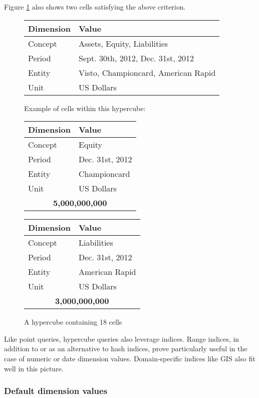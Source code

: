 \documentclass{acm_proc_article-sp}
\begin{document}
Figure \ref{fig-hypercube} also shows two cells satisfying the above criterion.

\begin{figure}
\caption{A hypercube containing 18 cells}
\label{fig-hypercube}
\begin{tabular}{|l|l|}
\hline
Dimension & Value \\
\hline
Concept & Assets, Equity, Liabilities \\
Period & Sept. 30th, 2012, Dec. 31st, 2012 \\
Entity & Visto, Championcard, American Rapid \\
Unit & US Dollars \\
\hline
\end{tabular}

Example of cells within this hypercube:

\begin{tabular}{|l|l|}
\hline
Dimension & Value \\
\hline
Concept & Equity \\
Period & Dec. 31st, 2012 \\
Entity & Championcard \\
Unit & US Dollars \\
\hline
\multicolumn{2}{|c|}{\textbf{5,000,000,000}} \\
\hline
\end{tabular}
\begin{tabular}{|l|l|}
\hline
Dimension & Value \\
\hline
Concept & Liabilities \\
Period & Dec. 31st, 2012 \\
Entity & American Rapid \\
Unit & US Dollars \\
\hline
\multicolumn{2}{|c|}{\textbf{3,000,000,000}} \\
\hline
\end{tabular}
\end{figure}

Like point queries, hypercube queries also leverage indices. Range indices, in addition to or as an alternative to hash indices, prove particularly useful in the case of numeric or date dimension values. Domain-specific indices like GIS also fit well in this picture.

\subsubsection{Default dimension values}
\end{document}
